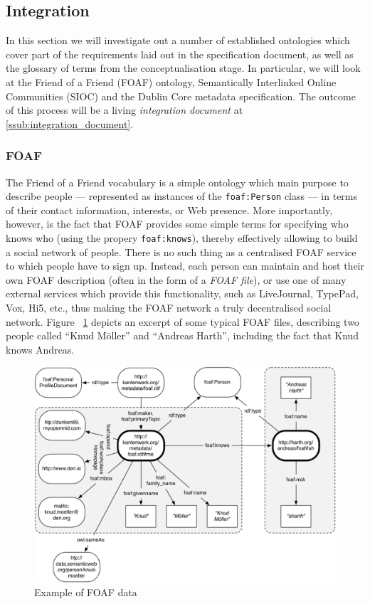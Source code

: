 \documentclass{fast_latex}
\begin{document}
\subsection{Integration} %
\label{sub:integration}

In this section we will investigate out a number of established ontologies which cover part of the requirements laid out in the specification document, as well as the glossary of terms from the conceptualisation stage. In particular, we will look at the Friend of a Friend (FOAF) ontology, Semantically Interlinked Online Communities (SIOC) and the Dublin Core metadata specification. The outcome of this process will be a living \emph{integration document} at \ref{ssub:integration_document}.

\subsubsection{FOAF} %
\label{ssub:foaf}

The Friend of a Friend vocabulary is a simple ontology which main purpose to describe people --- represented as instances of the \texttt{foaf:Person} class --- in terms of their contact information, interests, or Web presence. More importantly, however, is the fact that FOAF provides some simple terms for specifying who knows who (using the propery \texttt{foaf:knows}), thereby effectively allowing to build a social network of people. There is no such thing as a centralised FOAF service to which people have to sign up. Instead, each person can maintain and host their own FOAF description (often in the form of a \emph{FOAF file}), or use one of many external services which provide this functionality, such as LiveJournal, TypePad, Vox, Hi5, etc., thus making the FOAF network a truly decentralised social network. Figure ~\ref{fig:foaf_example} depicts an excerpt of some typical FOAF files, describing two people called ``Knud M\"oller'' and ``Andreas Harth'', including the fact that Knud knows Andreas.

\begin{figure}
  \begin{center}
    \includegraphics[width=\linewidth]{images/foaf_example.pdf}
    \caption{Example of FOAF data}
    \label{fig:foaf_example}
  \end{center}
\end{figure}
\end{document}
